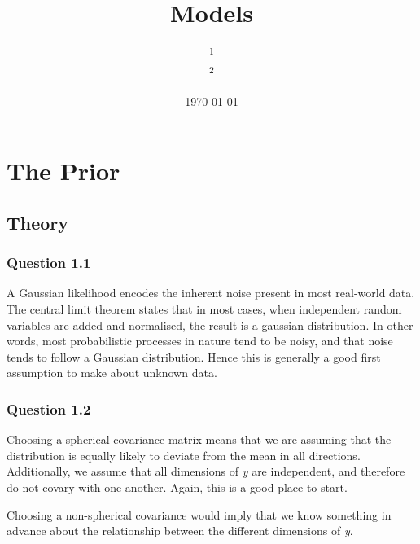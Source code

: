 \documentclass[10pt, a4paper, twocolumn]{article} %
\title{Models} %
\author{
	\authorstyle{Justin Salmon\textsuperscript{1} and George Lancaster\textsuperscript{2}} %
	\newline\newline %
	\textsuperscript{1}\institution{wr18313}\\ %
	\textsuperscript{2}\institution{qv18258} %
}
\date{\today} %
\begin{document}
\maketitle %

\thispagestyle{firstpage} %




\section{The Prior}

\subsection{Theory}

\subsubsection*{Question 1.1}
A Gaussian likelihood encodes the inherent noise present in most real-world data. The central limit theorem states that in most cases, when independent random variables are added and normalised, the result is a gaussian distribution. In other words, most probabilistic processes in nature tend to be noisy, and that noise tends to follow a Gaussian distribution. Hence this is generally a good first assumption to make about unknown data.
\subsubsection*{Question 1.2}
Choosing a spherical covariance matrix means that we are assuming that the distribution is equally likely to deviate from the mean in all directions. Additionally, we assume that all dimensions of \emph{y} are independent, and therefore do not covary with one another. Again, this is a good place to start. \par
Choosing a non-spherical covariance would imply that we know something in advance about the relationship between the different dimensions of \emph{y}.
\end{document}

